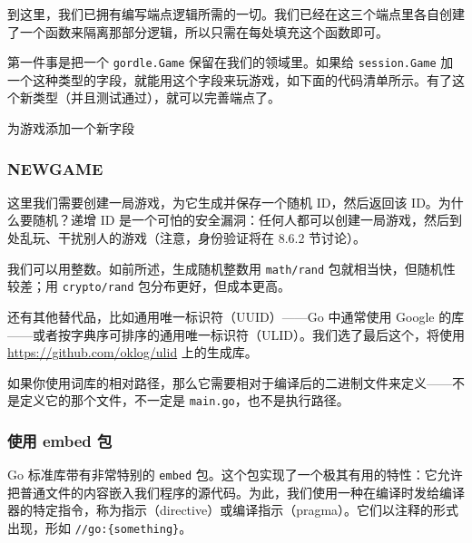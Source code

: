 到这里，我们已拥有编写端点逻辑所需的一切。我们已经在这三个端点里各自创建了一个函数来隔离那部分逻辑，所以只需在每处填充这个函数即可。

第一件事是把一个 \texttt{gordle.Game} 保留在我们的领域里。如果给 \texttt{session.Game} 加一个这种类型的字段，就能用这个字段来玩游戏，如下面的代码清单所示。有了这个新类型（并且测试通过），就可以完善端点了。


\begin{codeannotations}
\item 为游戏添加一个新字段
\end{codeannotations}

\subsubsection*{NEWGAME}

这里我们需要创建一局游戏，为它生成并保存一个随机 ID，然后返回该 ID。为什么要随机？递增 ID 是一个可怕的安全漏洞：任何人都可以创建一局游戏，然后到处乱玩、干扰别人的游戏（注意，身份验证将在 8.6.2 节讨论）。

我们可以用整数。如前所述，生成随机整数用 \texttt{math/rand} 包就相当快，但随机性较差；用 \texttt{crypto/rand} 包分布更好，但成本更高。

还有其他替代品，比如通用唯一标识符（UUID）——Go 中通常使用 Google 的库——或者按字典序可排序的通用唯一标识符（ULID）。我们选了最后这个，将使用 \url{https://github.com/oklog/ulid} 上的生成库。

如果你使用词库的相对路径，那么它需要相对于编译后的二进制文件来定义——不是定义它的那个文件，不一定是 \texttt{main.go}，也不是执行路径。

\subsubsection*{使用 embed 包}

Go 标准库带有非常特别的 \texttt{embed} 包。这个包实现了一个极其有用的特性：它允许把普通文件的内容嵌入我们程序的源代码。为此，我们使用一种在编译时发给编译器的特定指令，称为指示（directive）或编译指示（pragma）。它们以注释的形式出现，形如 \texttt{//go:\{something\}}。

